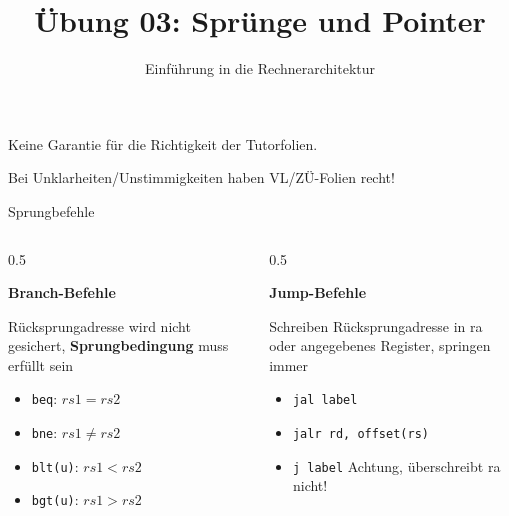 


\title{Übung 03: Sprünge und Pointer}
\subtitle{Einführung in die Rechnerarchitektur}
\date{}



\maketitle

\begin{frame}[c]{}{}
	\begin{center}
		\LARGE  Keine Garantie für die Richtigkeit der Tutorfolien.

		\Large Bei Unklarheiten/Unstimmigkeiten haben VL/ZÜ-Folien recht!
	\end{center}
\end{frame}

\begin{frame}[c, fragile]{Sprungbefehle}{}
	\vspace{-1cm}
	\begin{columns}
		\begin{column}{0.5\textwidth}
			\begin{center}\textbf{Branch-Befehle}\end{center}
			Rücksprungadresse wird nicht gesichert, \textbf{Sprungbedingung}
			muss erfüllt sein
			\begin{itemize}
				\item \verb|beq|: $rs1 = rs2$
				\item \verb|bne|: $rs1 \ne rs2$
				\item \verb|blt(u)|: $rs1 < rs2$
				\item \verb|bgt(u)|: $rs1 > rs2$
			\end{itemize}
		\end{column}
		\begin{column}{0.5\textwidth}
			\begin{center}\textbf{Jump-Befehle}\end{center}
			Schreiben Rücksprungadresse in ra oder angegebenes Register,
			springen immer
			\begin{itemize}
				\item \verb|jal label|
				\item \verb|jalr rd, offset(rs)|
				\item \verb|j label| Achtung, überschreibt ra nicht!
			\end{itemize}
		\end{column}
	\end{columns}
\end{frame}

